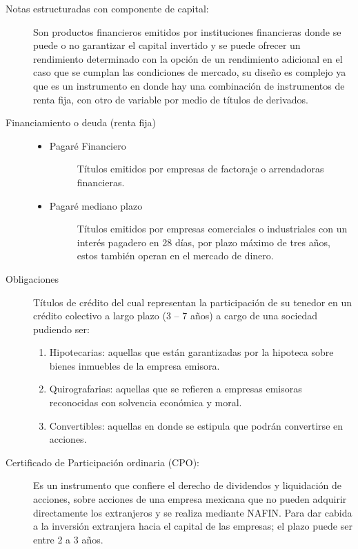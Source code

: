 \documentclass[10pt,letterpaper]{book}
\begin{document}
\begin{description}
    \item[Notas estructuradas con componente de capital:] \hfill \break Son productos financieros emitidos por instituciones financieras donde se puede o no garantizar el capital invertido y se puede ofrecer un rendimiento determinado con la opción de un rendimiento adicional en el caso que se cumplan las condiciones de mercado, su diseño es complejo ya que es un instrumento en donde hay una combinación de instrumentos de renta fija, con otro de variable por medio de títulos de derivados.
    \item[Financiamiento o deuda (renta fija)] \begin{itemize}
        \item \begin{description}
            \item[Pagaré Financiero] \hfill \break Títulos emitidos por empresas de factoraje o arrendadoras financieras.
        \end{description}        
        \item \begin{description}            
            \item[Pagaré mediano plazo] \hfill \break Títulos emitidos por empresas comerciales o industriales con un interés pagadero en 28 días, por plazo máximo de tres años, estos también operan en el mercado de dinero.
        \end{description}    
    \end{itemize}
    \item[Obligaciones] \hfill \break Títulos de crédito del cual representan la participación de su tenedor en un crédito colectivo a largo plazo (3 – 7 años) a cargo de una sociedad pudiendo ser: \begin{enumerate}
        \item Hipotecarias: aquellas que están garantizadas por la hipoteca sobre bienes inmuebles de la empresa emisora.
        \item Quirografarias: aquellas que se refieren a empresas emisoras reconocidas con solvencia económica y moral.
        \item Convertibles: aquellas en donde se estipula que podrán convertirse en acciones.
    \end{enumerate}
    \item[Certificado de Participación ordinaria (CPO):] \hfill \break Es un instrumento que confiere el derecho de dividendos y liquidación de acciones, sobre acciones de una empresa mexicana que no pueden adquirir directamente los extranjeros y se realiza mediante NAFIN. Para dar cabida a la inversión extranjera hacia el capital de las empresas; el plazo puede ser entre 2 a 3 años.

\end{description}
\end{document}

